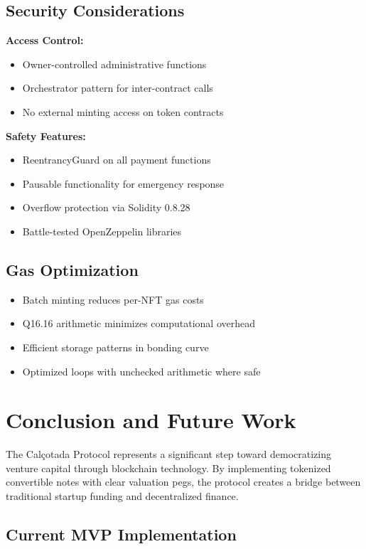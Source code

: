 \documentclass[conference]{IEEEtran}
\begin{document}
\subsection{Security Considerations}

\textbf{Access Control:}
\begin{itemize}
    \item Owner-controlled administrative functions
    \item Orchestrator pattern for inter-contract calls
    \item No external minting access on token contracts
\end{itemize}

\textbf{Safety Features:}
\begin{itemize}
    \item ReentrancyGuard on all payment functions
    \item Pausable functionality for emergency response
    \item Overflow protection via Solidity 0.8.28
    \item Battle-tested OpenZeppelin libraries
\end{itemize}

\subsection{Gas Optimization}

\begin{itemize}
    \item Batch minting reduces per-NFT gas costs
    \item Q16.16 arithmetic minimizes computational overhead
    \item Efficient storage patterns in bonding curve
    \item Optimized loops with unchecked arithmetic where safe
\end{itemize}

\section{Conclusion and Future Work}

The Calçotada Protocol represents a significant step toward democratizing venture capital through blockchain technology. By implementing tokenized convertible notes with clear valuation pegs, the protocol creates a bridge between traditional startup funding and decentralized finance.

\subsection{Current MVP Implementation}
\end{document}
